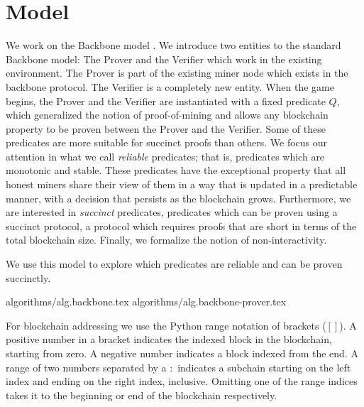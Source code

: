 \section{Model}

We work on the Backbone model \cite{backbone}. We introduce two entities to
the standard Backbone model: The Prover and the Verifier which work in the
existing environment. The Prover is part of the existing miner node which
exists in the backbone protocol. The Verifier is a completely new entity. When
the game begins, the Prover and the Verifier are instantiated with a fixed
predicate $Q$, which generalized the notion of proof-of-mining and allows any
blockchain property to be proven between the Prover and the Verifier. Some of
these predicates are more suitable for succinct proofs than others. We focus
our attention in what we call \textit{ reliable} predicates; that is,
predicates which are monotonic and stable.  These predicates have the
exceptional property that all honest miners share their view of them in a way
that is updated in a predictable manner, with a decision that persists as the
blockchain grows.  Furthermore, we are interested in \textit{succinct}
predicates, predicates which can be proven using a succinct protocol, a
protocol which requires proofs that are short in terms of the total blockchain
size. Finally, we formalize the notion of non-interactivity.

We use this model to explore which predicates are reliable and can be proven
succinctly.

{algorithms/alg.backbone.tex}
{algorithms/alg.backbone-prover.tex}

For blockchain addressing we use the Python range notation of brackets ($[]$).
A positive number in a bracket indicates the indexed block in the blockchain,
starting from zero. A negative number indicates a block indexed from the end. A
range of two numbers separated by a $:$ indicates a subchain starting on the
left index and ending on the right index, inclusive. Omitting one of the range
indices takes it to the beginning or end of the blockchain respectively.
